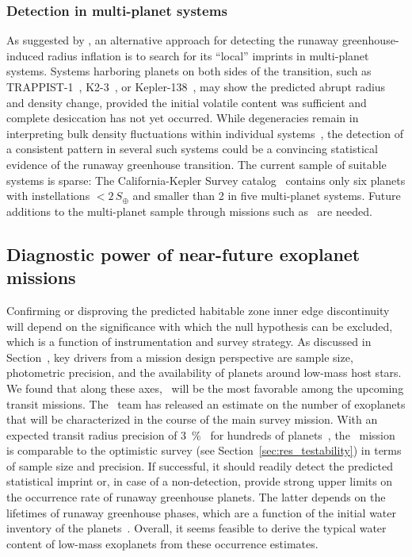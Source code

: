 \documentclass[twocolumn,twocolappendix]{aastex631}
\begin{document}
\subsubsection{Detection in multi-planet systems}
As suggested by \citet{Turbet2019}, an alternative approach for detecting the runaway greenhouse-induced radius inflation is to search for its ``local'' imprints in multi-planet systems.
Systems harboring planets on both sides of the transition, such as \mbox{TRAPPIST-1}~\citep{Gillon2016a,Gillon2017a,Luger2017c,Agol2021}, \mbox{K2-3}~\citep{2022AJ....164..172D}, or \mbox{Kepler-138}~\citep{2022NatAs.tmp..269P}, may show the predicted abrupt radius and density change, provided the initial volatile content was sufficient and complete desiccation has not yet occurred.
While degeneracies remain in interpreting bulk density fluctuations within individual systems~\citep[e.g.,][]{Turbet2020,Dorn2021}, the detection of a consistent pattern in several such systems could be a convincing statistical evidence of the runaway greenhouse transition.
The current sample of suitable systems is sparse: The California-Kepler Survey catalog~\citep{Fulton2018} contains only six planets with instellations $< 2\, S_\oplus$ and smaller than \SI{2}{\rEarth} in five multi-planet systems.
Future additions to the multi-planet sample through missions such as \plato\ are needed.

\subsection{Diagnostic power of near-future exoplanet missions}\label{sec:dis_samplesize}
Confirming or disproving the predicted habitable zone inner edge discontinuity will depend on the significance with which the null hypothesis can be excluded, which is a function of instrumentation and survey strategy.
As discussed in Section~\label{sec:dis_keyfactors}, key drivers from a mission design perspective are sample size, photometric precision, and the availability of planets around low-mass host stars.
We found that along these axes, \plato\ will be the most favorable among the upcoming transit missions.
The \plato\ team has released an estimate on the number of exoplanets that will be characterized in the course of the main survey mission.%
With an expected transit radius precision of \SI{3}{\percent}~\citep{plato2017} for hundreds of planets~\citep{Rauer2021}, the \plato\ mission is comparable to the optimistic survey (see Section~\ref{sec:res_testability}) in terms of sample size and precision.
If successful, it should readily detect the predicted statistical imprint or, in case of a non-detection, provide strong upper limits on the occurrence rate of runaway greenhouse planets.
The latter depends on the lifetimes of runaway greenhouse phases, which are a function of the initial water inventory of the planets~\citep{Hamano2015}.
Overall, it seems feasible to derive the typical water content of low-mass exoplanets from these occurrence estimates.
\end{document}
